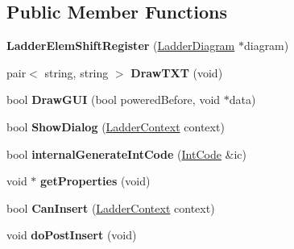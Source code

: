 \subsection*{Public Member Functions}
\begin{DoxyCompactItemize}
\item 
\hypertarget{class_ladder_elem_shift_register_a94d17c98d27949b489c48ff8f2a6aec1}{{\bfseries Ladder\-Elem\-Shift\-Register} (\hyperlink{class_ladder_diagram}{Ladder\-Diagram} $\ast$diagram)}\label{class_ladder_elem_shift_register_a94d17c98d27949b489c48ff8f2a6aec1}

\item 
\hypertarget{class_ladder_elem_shift_register_a85d5700e1e12bd11bd20fde7a5d88db9}{pair$<$ string, string $>$ {\bfseries Draw\-T\-X\-T} (void)}\label{class_ladder_elem_shift_register_a85d5700e1e12bd11bd20fde7a5d88db9}

\item 
\hypertarget{class_ladder_elem_shift_register_afd462235842c505e3774b0b0d2e18bf4}{bool {\bfseries Draw\-G\-U\-I} (bool powered\-Before, void $\ast$data)}\label{class_ladder_elem_shift_register_afd462235842c505e3774b0b0d2e18bf4}

\item 
\hypertarget{class_ladder_elem_shift_register_abb5c346b0b86d4343a7aabdb04b45188}{bool {\bfseries Show\-Dialog} (\hyperlink{struct_ladder_context}{Ladder\-Context} context)}\label{class_ladder_elem_shift_register_abb5c346b0b86d4343a7aabdb04b45188}

\item 
\hypertarget{class_ladder_elem_shift_register_ad8fd3dea74677cd663463d615987cd36}{bool {\bfseries internal\-Generate\-Int\-Code} (\hyperlink{class_int_code}{Int\-Code} \&ic)}\label{class_ladder_elem_shift_register_ad8fd3dea74677cd663463d615987cd36}

\item 
\hypertarget{class_ladder_elem_shift_register_ae2bf2f0c7e48fb4123de69ca5ad0b7d0}{void $\ast$ {\bfseries get\-Properties} (void)}\label{class_ladder_elem_shift_register_ae2bf2f0c7e48fb4123de69ca5ad0b7d0}

\item 
\hypertarget{class_ladder_elem_shift_register_a8756101db0e36d62a689b95b86e0343f}{bool {\bfseries Can\-Insert} (\hyperlink{struct_ladder_context}{Ladder\-Context} context)}\label{class_ladder_elem_shift_register_a8756101db0e36d62a689b95b86e0343f}

\item 
\hypertarget{class_ladder_elem_shift_register_a57ff08ddec87af31ea531fbf42588b3c}{void {\bfseries do\-Post\-Insert} (void)}\label{class_ladder_elem_shift_register_a57ff08ddec87af31ea531fbf42588b3c}


\end{DoxyCompactItemize}
